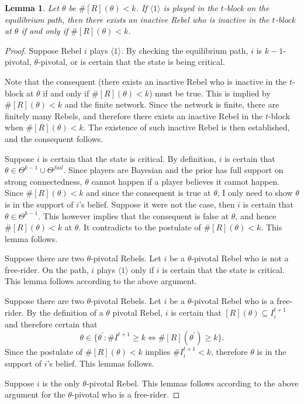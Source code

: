 \documentclass[12pt,letter]{article}
\newtheorem{lemma}{Lemma}[section]
\theoremstyle{definition}
\theoremstyle{remark}
\theoremstyle{claim}
\begin{document}
\begin{lemma} Let $\theta$ be $\#[R](\theta)< k$. If $\langle 1 \rangle$ is played in the $t$-block on the equilibrium path, then there exists an inactive Rebel who is inactive in the $t$-block at $\theta$ if and only if $\#[R](\theta)<k$.
\end{lemma}
\begin{proof}
Suppose Rebel $i$ plays $\langle 1 \rangle$. By checking the equilibrium path, $i$ is $k-1$-pivotal, $\theta$-pivotal, or is certain that the state is being critical. 

Note that the consequent (there exists an inactive Rebel who is inactive in the $t$-block at $\theta$ if and only if $\#[R](\theta)<k$) must be true. This is implied by $\#[R](\theta)<k$ and the finite network. Since the network is finite, there are finitely many Rebels, and therefore there exists an inactive Rebel in the $t$-block when $\#[R](\theta)<k$. The existence of such inactive Rebel is then established, and the consequent follows.

Suppose $i$ is certain that the state is critical. By definition, $i$ is certain that $\theta\in \Theta^{k-1}\cup\Theta^{fail}$. Since players are Bayesian and the prior has full support on strong connectedness, $\theta$ cannot happen if a player believes it cannot happen. Since $\#[R](\theta)<k$ and since the consequent is true at $\theta$, I only need to show $\theta$ is in the support of $i$'s belief. Suppose it were not the case, then $i$ is certain that $\theta\in \Theta^{k-1}$. This however implies that the consequent is false at $\theta$, and hence $\#[R](\theta)<k$ at $\theta$. It contradicts to the postulate of $\#[R](\theta)<k$. This lemma follows.

Suppose there are two $\theta$-pivotal Rebels. Let $i$ be a $\theta$-pivotal Rebel who is not a free-rider. On the path, $i$ plays $\langle 1 \rangle$ only if $i$ is certain that the state is critical. This lemma follows according to the above argument.

Suppose there are two $\theta$-pivotal Rebels. Let $i$ be a $\theta$-pivotal Rebel who is a free-rider. By the definition of a $\theta$ pivotal Rebel, $i$ is certain that $[R](\theta)\subseteq I^{t+1}_i$ and therefore certain that \[\theta\in\{\theta^{'}:\#I^{t+1}\geq k \Leftrightarrow \#[R](\theta^{'})\geq k\}.\] Since the postulate of $\#[R](\theta)<k$ implies $\#I^{t+1}_i<k$, therefore $\theta$ is in the support of $i$'s belief. This lemmas follows. 

Suppose $i$ is the only $\theta$-pivotal Rebel. This lemmas follows according to the above argument for the $\theta$-pivotal who is a free-rider.

\end{proof}
\end{document}

